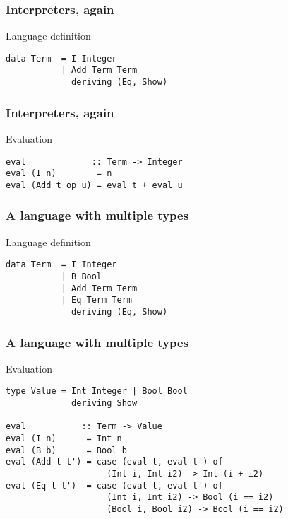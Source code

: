 \documentclass[pdftex,aspectratio=169]{beamer}
\author[Gabriel Radanne]{Dr. Gabriel Radanne}
\subtitle
{GADT: Generalized Algebraic DataType}
\begin{document}
\begin{frame}
  \titlepage
\end{frame}

\begin{frame}[fragile]
  \frametitle{Interpreters, again}
  \begin{block}{Language definition}
    \begin{lstlisting}
data Term  = I Integer
           | Add Term Term
             deriving (Eq, Show)
  \end{lstlisting}
\end{block}
\end{frame}

\begin{frame}[fragile]
  \frametitle{Interpreters, again}
  \begin{block}{Evaluation}
    \begin{lstlisting}
eval             :: Term -> Integer
eval (I n)        = n
eval (Add t op u) = eval t + eval u
  \end{lstlisting}
\end{block}
\end{frame}


\begin{frame}[fragile]
  \frametitle{A language with multiple types}
  \begin{block}{Language definition}
    \begin{lstlisting}
data Term  = I Integer
           | B Bool
           | Add Term Term
           | Eq Term Term
             deriving (Eq, Show)
  \end{lstlisting}
\end{block}
\end{frame}

\begin{frame}[fragile]
  \frametitle{A language with multiple types}
  \begin{block}{Evaluation}
    \begin{lstlisting}
type Value = Int Integer | Bool Bool
             deriving Show
      
eval           :: Term -> Value
eval (I n)      = Int n
eval (B b)      = Bool b
eval (Add t t') = case (eval t, eval t') of
                    (Int i, Int i2) -> Int (i + i2)
eval (Eq t t')  = case (eval t, eval t') of
                    (Int i, Int i2) -> Bool (i == i2)
                    (Bool i, Bool i2) -> Bool (i == i2)
  \end{lstlisting}
\end{block}
\end{frame}
\end{document}
